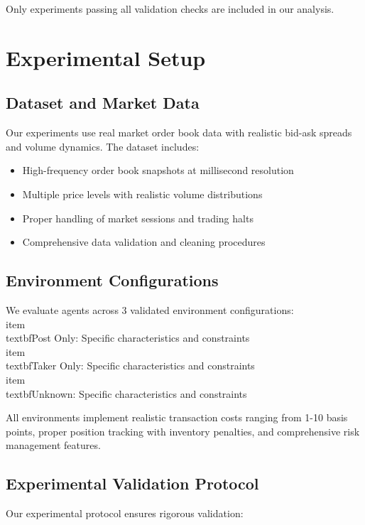 \documentclass[11pt,a4paper]{article}
\begin{document}
Only experiments passing all validation checks are included in our analysis.
\n\n
\section{Experimental Setup}
\label{sec:experiments}

\subsection{Dataset and Market Data}

Our experiments use real market order book data with realistic bid-ask spreads and volume dynamics. The dataset includes:
\begin{itemize}
\item High-frequency order book snapshots at millisecond resolution
\item Multiple price levels with realistic volume distributions
\item Proper handling of market sessions and trading halts
\item Comprehensive data validation and cleaning procedures
\end{itemize}

\subsection{Environment Configurations}

We evaluate agents across 3 validated environment configurations:
\\item \\textbf{Post Only}: Specific characteristics and constraints
\\item \\textbf{Taker Only}: Specific characteristics and constraints
\\item \\textbf{Unknown}: Specific characteristics and constraints

All environments implement realistic transaction costs ranging from 1-10 basis points, proper position tracking with inventory penalties, and comprehensive risk management features.

\subsection{Experimental Validation Protocol}

Our experimental protocol ensures rigorous validation:
\end{document}
